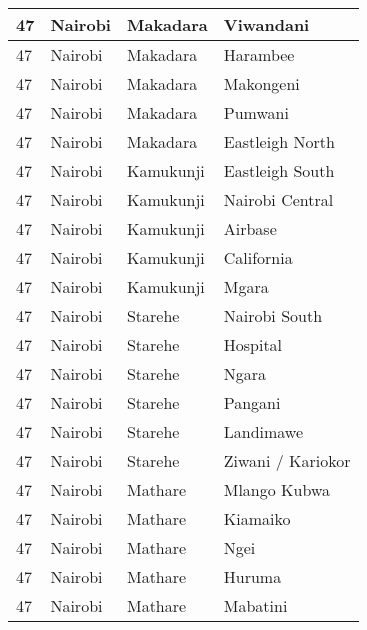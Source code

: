 \begin{table}[!ht]
\begin{tabular}{|l|l|l|l|}
        47 & Nairobi & Makadara & Viwandani \\ \hline
        47 & Nairobi & Makadara & Harambee \\ \hline
        47 & Nairobi & Makadara & Makongeni \\ \hline
        47 & Nairobi & Makadara & Pumwani \\ \hline
        47 & Nairobi & Makadara & Eastleigh North \\ \hline
        47 & Nairobi & Kamukunji & Eastleigh South \\ \hline
        47 & Nairobi & Kamukunji & Nairobi Central \\ \hline
        47 & Nairobi & Kamukunji & Airbase \\ \hline
        47 & Nairobi & Kamukunji & California \\ \hline
        47 & Nairobi & Kamukunji & Mgara \\ \hline
        47 & Nairobi & Starehe & Nairobi South \\ \hline
        47 & Nairobi & Starehe & Hospital \\ \hline
        47 & Nairobi & Starehe & Ngara \\ \hline
        47 & Nairobi & Starehe & Pangani \\ \hline
        47 & Nairobi & Starehe & Landimawe \\ \hline
        47 & Nairobi & Starehe & Ziwani / Kariokor \\ \hline
        47 & Nairobi & Mathare & Mlango Kubwa \\ \hline
        47 & Nairobi & Mathare & Kiamaiko \\ \hline
        47 & Nairobi & Mathare & Ngei \\ \hline
        47 & Nairobi & Mathare & Huruma \\ \hline
        47 & Nairobi & Mathare & Mabatini \\ \hline
    \end{tabular}
\end{table}